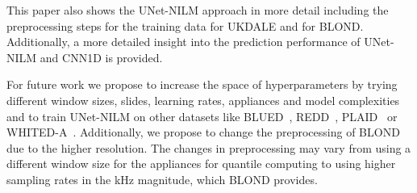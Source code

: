 \documentclass[sigconf]{acmart}
\begin{document}
This paper also shows the UNet-NILM approach in more detail including the preprocessing steps for the training data for UKDALE and for BLOND. 
Additionally, a more detailed insight into the prediction performance of UNet-NILM and CNN1D is provided. 

For future work we propose to increase the space of hyperparameters by trying different window sizes,
slides, learning rates, appliances and model complexities and to train UNet-NILM on other datasets 
like BLUED~\cite{BLUED}, REDD~\cite{Kolter2011REDDA}, PLAID~\cite{Gao2014PLAIDAP} or WHITED-A~\cite{Kahl2016WHITEDAWH}.
Additionally, we propose to change the preprocessing of BLOND due to the higher resolution. The changes in preprocessing may vary from 
using a different window size for the appliances for quantile computing to using higher sampling rates in the kHz magnitude, which BLOND provides.



\end{document}
